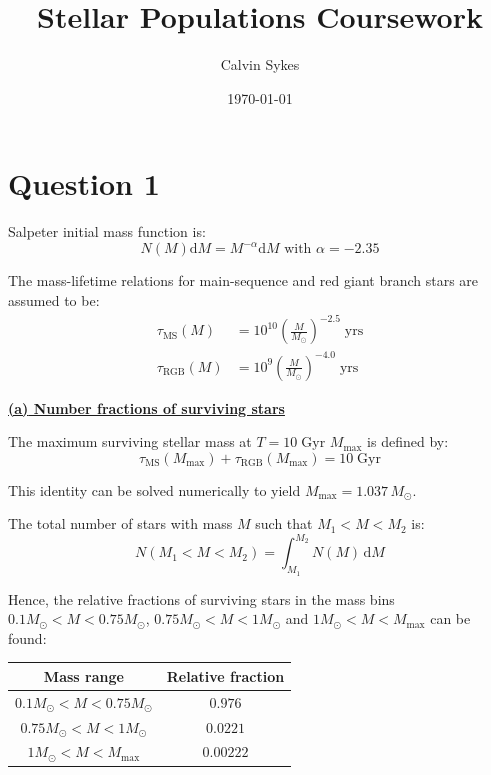 \documentclass{article}
\title{Stellar Populations Coursework}
\author{Calvin Sykes}
\date{\today}
\begin{document}
\maketitle

\section*{Question 1}

Salpeter initial mass function is:
\begin{equation}
  N(M)\mathrm{d}M=M^{-\alpha}\mathrm{d}M\mbox{ with }\alpha=-2.35
\end{equation}

The mass-lifetime relations for main-sequence and red giant branch stars are assumed to be:
\begin{align}
  \tau_{\mathrm{MS}}(M)&=10^{10}\left(\frac{M}{M_\odot}\right)^{-2.5}\;\mathrm{yrs}\\
  \tau_{\mathrm{RGB}}(M)&=10^{9}\left(\frac{M}{M_\odot}\right)^{-4.0}\;\mathrm{yrs}
\end{align}

\underline{\bf{(a)} Number fractions of surviving stars}

The maximum surviving stellar mass at $T=10\;\mathrm{Gyr}$ $M_{\mathrm{max}}$ is defined by:
\begin{equation}
  \tau_{\mathrm{MS}}(M_{\mathrm{max}})+\tau_{\mathrm{RGB}}(M_{\mathrm{max}})=10\;\mathrm{Gyr}
\end{equation}

This identity can be solved numerically to yield $M_{\mathrm{max}}=1.037\,M_\odot$.

The total number of stars with mass $M$ such that $M_1<M<M_2$ is:
\begin{equation}
  N(M_1<M<M_2)=\int_{M_1}^{M_2} N(M)\,\mathrm{d}M
\end{equation}

Hence, the relative fractions of surviving stars in the mass bins $0.1M_\odot<M<0.75M_\odot$, $0.75M_\odot<M<1M_\odot$ and $1M_\odot<M<M_{\mathrm{max}}$ can be found:
\begin{table}[h]
  \centering
  \begin{tabular}{c|c}
    Mass range & Relative fraction\\\hline
    $0.1M_\odot<M<0.75M_\odot$ & $0.976$\\
    $0.75M_\odot<M<1M_\odot$ & $0.0221$\\
    $1M_\odot<M<M_{\mathrm{max}}$ & $0.00222$
  \end{tabular}
\end{table}
\end{document}

